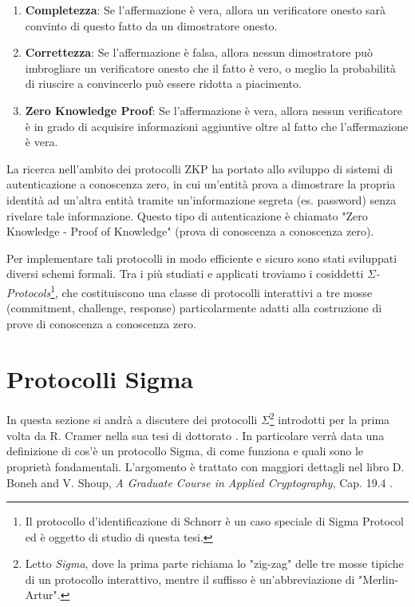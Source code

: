 \begin{enumerate}
	\item \textbf{Completezza}: Se l'affermazione è vera, allora un verificatore onesto sarà convinto di questo fatto da un dimostratore onesto.
	\item \textbf{Correttezza}: Se l'affermazione è falsa, allora nessun dimostratore può imbrogliare un verificatore onesto che il fatto è vero, o meglio la probabilità di riuscire a convincerlo può essere ridotta a piacimento.
	\item \textbf{Zero Knowledge Proof}: Se l'affermazione è vera, allora nessun verificatore è in grado di acquisire informazioni aggiuntive oltre al fatto che l'affermazione è vera. 
\end{enumerate}

La ricerca nell'ambito dei protocolli ZKP ha portato allo sviluppo di sistemi di autenticazione a conoscenza zero, in cui un'entità prova a dimostrare la propria identità ad un'altra entità tramite un'informazione segreta (es. password) senza rivelare tale informazione. Questo tipo di autenticazione è chiamato "Zero Knowledge - Proof of Knowledge" (prova di conoscenza a conoscenza zero).

Per implementare tali protocolli in modo efficiente e sicuro sono stati sviluppati diversi schemi formali. Tra i più studiati e applicati troviamo i cosiddetti \textit{$\Sigma$-Protocols}\footnote{Il protocollo d'identificazione di Schnorr è un caso speciale di Sigma Protocol ed è oggetto di studio di questa tesi.}, che costituiscono una classe di protocolli interattivi a tre mosse (commitment, challenge, response) particolarmente adatti alla costruzione di prove di conoscenza a conoscenza zero. 

\newpage

\section{Protocolli Sigma}

In questa sezione si andrà a discutere dei protocolli $\Sigma$\footnote{Letto \textit{Sigma}, dove la prima parte richiama lo "zig-zag" delle tre mosse tipiche di un protocollo interattivo, mentre il suffisso è un'abbreviazione di "Merlin-Artur".} introdotti per la prima volta da R. Cramer nella sua tesi di dottorato \cite{pub:21438}. In particolare verrà data una definizione di cos'è un protocollo Sigma, di come funziona e quali sono le proprietà fondamentali. L'argomento è trattato con maggiori dettagli nel libro D. Boneh and V. Shoup, \textit{A Graduate Course in Applied Cryptography}, Cap. 19.4 \cite{boneh2020applied}.

